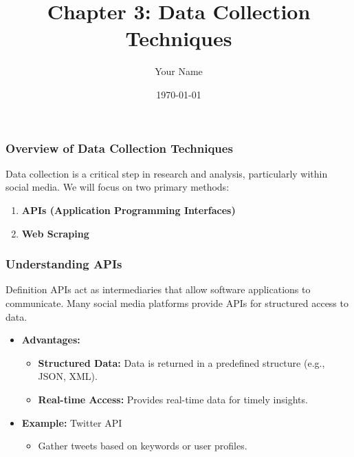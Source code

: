 \documentclass{beamer}
\title{Chapter 3: Data Collection Techniques}
\author{Your Name}
\institute{Your Institution}
\date{\today}
\begin{document}
\frame{\titlepage}

\begin{frame}
    \titlepage
\end{frame}

\begin{frame}[fragile]
    \frametitle{Overview of Data Collection Techniques}
    Data collection is a critical step in research and analysis, particularly within social media. We will focus on two primary methods:

    \begin{enumerate}
        \item \textbf{APIs (Application Programming Interfaces)}
        \item \textbf{Web Scraping}
    \end{enumerate}
\end{frame}

\begin{frame}[fragile]
    \frametitle{Understanding APIs}
    \begin{block}{Definition}
        APIs act as intermediaries that allow software applications to communicate. Many social media platforms provide APIs for structured access to data.
    \end{block}

    \begin{itemize}
        \item \textbf{Advantages:}
        \begin{itemize}
            \item \textbf{Structured Data:} Data is returned in a predefined structure (e.g., JSON, XML).
            \item \textbf{Real-time Access:} Provides real-time data for timely insights.
        \end{itemize}
        
        \item \textbf{Example:} Twitter API
        \begin{itemize}
            \item Gather tweets based on keywords or user profiles.
        \end{itemize}
    \end{itemize}
\end{frame}
\end{document}
